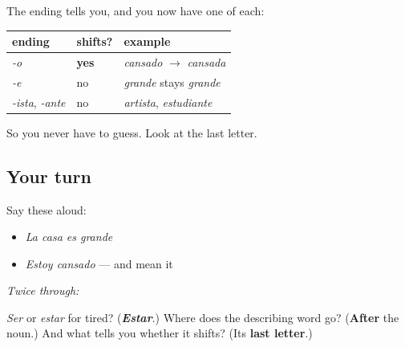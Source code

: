 \begin{grammarlens}[title={Grammar Lens: which words shift}]
The ending tells you, and you now have one of each:

\noindent
\begin{tabularx}{\linewidth}{@{}>{\raggedright\arraybackslash}X>{\raggedright\arraybackslash}X>{\raggedright\arraybackslash}X@{}}
\toprule
\textbf{ending} & \textbf{shifts?} & \textbf{example} \\
\midrule
\emph{-o} & \textbf{yes} & \emph{cansado} $\to$ \emph{cansada} \\
\emph{-e} & no & \emph{grande} stays \emph{grande} \\
\emph{-ista}, \emph{-ante} & no & \emph{artista}, \emph{estudiante} \\
\bottomrule
\end{tabularx}

So you never have to guess. Look at the last letter.
\end{grammarlens}

\subsection*{Your turn}
Say these aloud:

\begin{itemize}
\raggedright
  \item \emph{La casa es grande}
  \item \emph{Estoy cansado} — and mean it
\end{itemize}

\emph{Twice through:}

\begin{tcolorbox}[breakable,colback=teal!4,colframe=teal!35!black,title={Before you move on}]
\emph{Ser} or \emph{estar} for tired? (\emph{\textbf{Estar}}.) Where does the describing word go? (\textbf{After} the noun.) And what tells you whether it shifts? (Its \textbf{last letter}.)
\end{tcolorbox}
